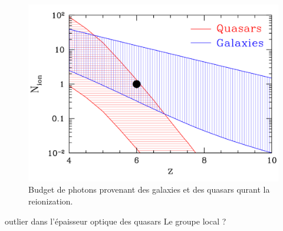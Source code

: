 \begin{figure}[bth]
        \includegraphics[width=.95\linewidth]{img/01/gal_AGN.pdf} 
        \caption{
        Budget de photons provenant des galaxies et des quasars qurant la reionization.
}
 		\label{fig:gal_AGN}
\end{figure}

outlier dans l'épaisseur optique des quasars
Le groupe local ?
